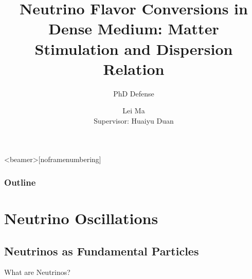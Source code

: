 \documentclass[9pt]{beamer}
\title{Neutrino Flavor Conversions in Dense Medium: Matter Stimulation and Dispersion Relation} %
\author{Lei Ma\\ Supervisor: Huaiyu Duan}
\subtitle{PhD Defense} %
\begin{document}
  \frame{\maketitle}


  \begin{darkframes}


      \begin{frame}<beamer>[noframenumbering]
        \frametitle{Outline}
        \tableofcontents
      \end{frame}

    \section{Neutrino Oscillations}

    \subsection{Neutrinos as Fundamental Particles}

    \begin{frame}{What are Neutrinos?}
      \begin{minipage}[\textheight]{\textwidth}
      \begin{columns}[T]


\end{columns}
\end{minipage}
\end{frame}
\end{darkframes}
\end{document}
